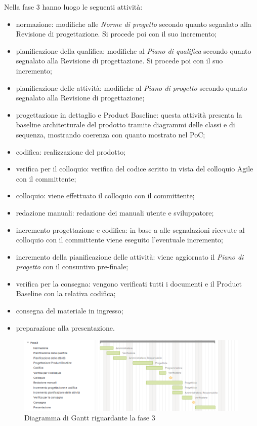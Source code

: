 Nella fase 3 hanno luogo le seguenti attività:
\begin{itemize}
	\item normazione: modifiche alle \textit{Norme di progetto} secondo quanto segnalato alla Revisione di progettazione. Si procede poi con il suo incremento;
	\item pianificazione della qualifica: modifiche al \textit{Piano di qualifica} secondo quanto segnalato alla Revisione di progettazione. Si procede poi con il suo incremento;
	\item pianificazione delle attività: modifiche al \textit{Piano di progetto} secondo quanto segnalato alla Revisione di progettazione;
	\item progettazione in dettaglio e Product Baseline: questa attività presenta la baseline architetturale del prodotto tramite diagrammi delle classi e di sequenza, mostrando coerenza con quanto mostrato nel PoC;
	\item codifica: realizzazione del prodotto;
	\item verifica per il colloquio: verifica del codice scritto in vista del colloquio Agile con il committente;
	\item colloquio: viene effettuato il colloquio con il committente;
	\item redazione manuali: redazione dei manuali utente e sviluppatore;
	\item incremento progettazione e codifica: in base a alle segnalazioni ricevute al colloquio con il committente viene eseguito l'eventuale incremento;
	\item incremento della pianificazione delle attività: viene aggiornato il \textit{Piano di progetto} con il consuntivo pre-finale;
	\item verifica per la consegna: vengono verificati tutti i documenti e il Product Baseline con la relativa codifica;
	\item consegna del materiale in ingresso;
	\item preparazione alla presentazione.
\end{itemize}

\begin{figure}[h]
	\centering
	\includegraphics[scale=0.70]{images/fase3.png}
	\caption{Diagramma di Gantt riguardante la fase 3}
\end{figure}